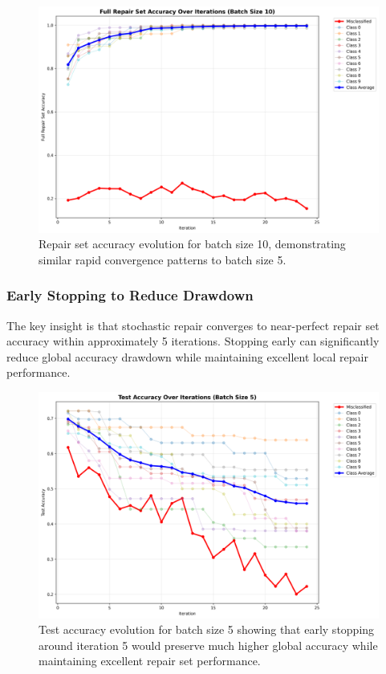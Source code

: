 \documentclass{article}
\begin{document}
\begin{figure}[h]
	\centering
	\includegraphics[width=\textwidth]{results/stochastic_analysis/batch_iterations/repair_accuracy_batch_10.png}
	\caption{Repair set accuracy evolution for batch size 10, demonstrating similar rapid convergence patterns to batch size 5.}
	\label{fig:repair_convergence_batch_10}
\end{figure}

\subsubsection{Early Stopping to Reduce Drawdown}

The key insight is that stochastic repair converges to near-perfect repair set accuracy within approximately 5 iterations. Stopping early can significantly reduce global accuracy drawdown while maintaining excellent local repair performance.

\begin{figure}[h]
	\centering
	\includegraphics[width=\textwidth]{results/stochastic_analysis/batch_iterations/test_accuracy_batch_5.png}
	\caption{Test accuracy evolution for batch size 5 showing that early stopping around iteration 5 would preserve much higher global accuracy while maintaining excellent repair set performance.}
	\label{fig:early_stopping_batch_5}
\end{figure}
\end{document}
